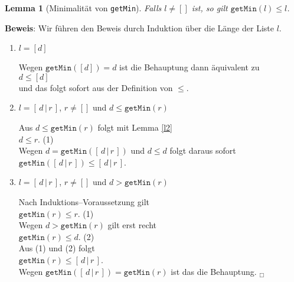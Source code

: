 \documentclass{article}
\newtheorem{Lemma}[Definition]{Lemma}
\begin{document}
\begin{Lemma}[Minimalit\"at von \texttt{getMin}] \label{l3}
Falls $l \not= []$ ist, so gilt $\mathtt{getMin}(l) \leq l$.
\end{Lemma}
\textbf{Beweis}:  Wir f\"uhren den Beweis durch Induktion \"uber die L\"ange der Liste $l$.
\begin{enumerate}
\item $l = [d]$

      Wegen $\mathtt{getMin}([d]) = d$ ist die Behauptung dann \"aquivalent zu \\[0.1cm]
      \hspace*{1.3cm} $d \leq [d]$ \\[0.1cm]
      und das folgt sofort aus der Definition von $\leq$.
\item $l = [\,d\,|\,r\,]$, $r \not= []$ und $d \leq \mathtt{getMin}(r)$

      Aus $d \leq \mathtt{getMin}(r)$ folgt mit Lemma \ref{l2} \\[0.1cm]
      \hspace*{1.3cm} $d \leq r$. \hspace*{\fill} (1) \\[0.1cm]
      Wegen $d = \mathtt{getMin}([\,d\,|\,r\,])$ und $d \leq d$ folgt daraus sofort \\[0.1cm]
      \hspace*{1.3cm} $\mathtt{getMin}([\,d\,|\,r\,]) \leq [\,d\,|\,r\,]$.
\item $l = [\,d\,|\,r\,]$, $r \not= []$ und $d > \mathtt{getMin}(r)$

     Nach Induktions--Voraussetzung gilt \\[0.1cm]
     \hspace*{1.3cm} $\mathtt{getMin}(r) \leq r$. \hspace*{\fill} (1) \\[0.1cm]
     Wegen $d > \mathtt{getMin}(r)$ gilt erst recht \\[0.1cm]
     \hspace*{1.3cm} $\mathtt{getMin}(r) \leq d$. \hspace*{\fill} (2) \\[0.1cm]
     Aus (1) und (2) folgt \\[0.1cm]
     \hspace*{1.3cm} $\mathtt{getMin}(r) \leq [\,d\,|\,r\,]$. \hspace*{\fill}  \\[0.1cm]
     Wegen $\mathtt{getMin}([\,d\,|\,r\,]) = \mathtt{getMin}(r)$ ist das die Behauptung. \hspace*{\fill}  $_\Box$
\end{enumerate}
\end{document}
